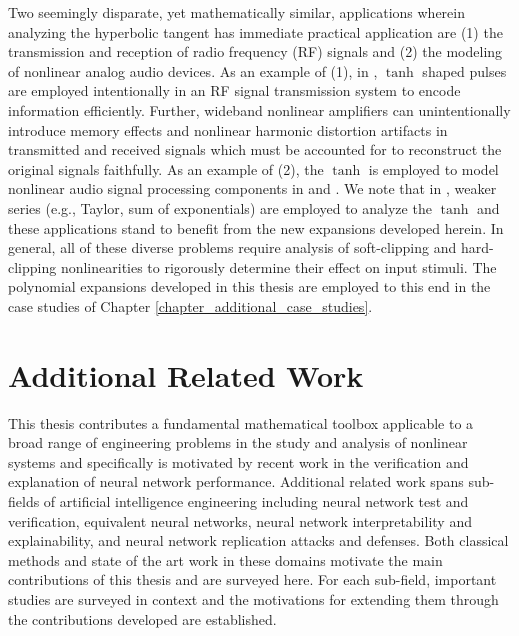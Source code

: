 Two seemingly disparate, yet mathematically similar, applications wherein
analyzing the hyperbolic tangent has immediate practical application are
(1) the transmission and reception of radio frequency
(RF) signals and (2) the modeling of nonlinear analog audio devices.
As an example of (1), in \cite{snopek_advantages_2007}, $\tanh$ shaped pulses
are employed intentionally in an RF signal transmission system to encode information
efficiently.
Further, wideband nonlinear amplifiers can unintentionally introduce
memory effects \cite{hyunchul_ku_behavioral_2003}
and nonlinear harmonic distortion \cite{narisi_wang_linearity_2005} artifacts
in transmitted and received signals which must be accounted for to reconstruct
the original signals faithfully.
As an example of (2), the $\tanh$ is employed to model nonlinear audio signal
processing components in \cite{schuck_jr._audio_2016} and \cite{lazzarini_new_2010}.
We note that in \cite{snopek_advantages_2007, lazzarini_new_2010, schuck_jr._audio_2016}, weaker series (e.g., Taylor, sum of exponentials) are
employed to analyze the $\tanh$ and these applications stand to
benefit from the new expansions developed herein.  In general, all of these diverse
problems require analysis of soft-clipping and hard-clipping nonlinearities to rigorously
determine their effect on input stimuli.  The
polynomial expansions developed in this thesis are employed to this end
in the case studies of Chapter \ref{chapter_additional_case_studies}.

\section{Additional Related Work}
This thesis contributes a fundamental mathematical toolbox applicable to a broad range of engineering problems in the study and analysis of nonlinear systems and specifically is motivated by recent work in the verification and explanation of neural network performance.  Additional related work spans sub-fields of artificial intelligence engineering including neural network test and verification, equivalent neural networks, neural network interpretability and explainability, and neural network replication attacks and defenses.  Both classical methods and state of the art work in these domains motivate the main contributions of this thesis and are surveyed here.  For each sub-field, important studies are surveyed in context and the motivations for extending them through the contributions developed are established.

